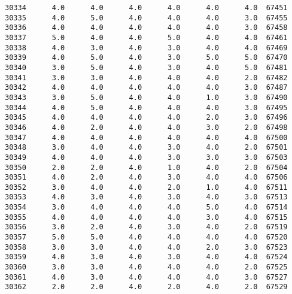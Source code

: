 \documentclass[11pt]{article}
\begin{document}
\begin{tcolorbox}[breakable, boxrule=.5pt, size=fbox, pad at break*=1mm, opacityfill=0]
\begin{Verbatim}[commandchars=\\\{\}]
30334      4.0      4.0      4.0      4.0      4.0      4.0  67451
30335      4.0      5.0      4.0      4.0      4.0      3.0  67455
30336      4.0      4.0      4.0      4.0      4.0      3.0  67458
30337      5.0      4.0      4.0      5.0      4.0      4.0  67461
30338      4.0      3.0      4.0      3.0      4.0      4.0  67469
30339      4.0      5.0      4.0      3.0      5.0      5.0  67470
30340      3.0      5.0      4.0      3.0      4.0      5.0  67481
30341      3.0      3.0      4.0      4.0      4.0      2.0  67482
30342      4.0      4.0      4.0      4.0      4.0      3.0  67487
30343      3.0      5.0      4.0      4.0      1.0      3.0  67490
30344      4.0      5.0      4.0      4.0      4.0      3.0  67495
30345      4.0      4.0      4.0      4.0      2.0      3.0  67496
30346      4.0      2.0      4.0      4.0      3.0      2.0  67498
30347      4.0      4.0      4.0      4.0      4.0      4.0  67500
30348      3.0      4.0      4.0      3.0      4.0      2.0  67501
30349      4.0      4.0      4.0      3.0      3.0      3.0  67503
30350      2.0      2.0      4.0      1.0      4.0      2.0  67504
30351      4.0      2.0      4.0      3.0      4.0      4.0  67506
30352      3.0      4.0      4.0      2.0      1.0      4.0  67511
30353      4.0      3.0      4.0      3.0      4.0      3.0  67513
30354      3.0      4.0      4.0      4.0      5.0      4.0  67514
30355      4.0      4.0      4.0      4.0      3.0      4.0  67515
30356      3.0      2.0      4.0      3.0      4.0      2.0  67519
30357      5.0      5.0      4.0      4.0      4.0      4.0  67520
30358      3.0      3.0      4.0      4.0      2.0      3.0  67523
30359      4.0      3.0      4.0      3.0      4.0      4.0  67524
30360      3.0      3.0      4.0      4.0      4.0      2.0  67525
30361      4.0      3.0      4.0      4.0      4.0      3.0  67527
30362      2.0      2.0      4.0      2.0      4.0      2.0  67529


\end{Verbatim}
\end{tcolorbox}
\end{document}
